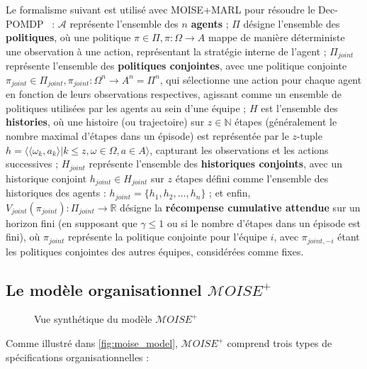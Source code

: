 Le formalisme suivant est utilisé avec MOISE+MARL pour résoudre le Dec-POMDP~\cite{Beynier2013,Albrecht2024} : $\mathcal{A}$ représente l'ensemble des $n$ \textbf{agents} ; $\Pi$ désigne l'ensemble des \textbf{politiques}, où une politique $\pi \in \Pi, \pi: \Omega \rightarrow A$ mappe de manière déterministe une observation à une action, représentant la stratégie interne de l'agent ; $\Pi_{joint}$ représente l'ensemble des \textbf{politiques conjointes}, avec une politique conjointe $\pi_{joint} \in \Pi_{joint}, \pi_{joint}: \Omega^n \rightarrow A^n = \Pi^n$, qui sélectionne une action pour chaque agent en fonction de leurs observations respectives, agissant comme un ensemble de politiques utilisées par les agents au sein d'une équipe ; $H$ est l'ensemble des \textbf{histories}, où une histoire (ou trajectoire) sur $z \in \mathbb{N}$ étapes (généralement le nombre maximal d'étapes dans un épisode) est représentée par le $z$-tuple $h = \langle \langle \omega_{k}, a_{k}\rangle | k \leq z, \omega \in \Omega, a \in A\rangle$, capturant les observations et les actions successives ; $H_{joint}$ représente l'ensemble des \textbf{historiques conjoints}, avec un historique conjoint $h_{joint} \in H_{joint}$ sur $z$ étapes défini comme l'ensemble des historiques des agents : $h_{joint} = \{h_1, h_2, \dots, h_n\}$ ; et enfin, $V_{joint}(\pi_{joint}): \Pi_{joint} \rightarrow \mathbb{R}$ désigne la \textbf{récompense cumulative attendue} sur un horizon fini (en supposant que $\gamma \leq 1$ ou si le nombre d'étapes dans un épisode est fini), où $\pi_{joint}$ représente la politique conjointe pour l'équipe $i$, avec $\pi_{joint,-i}$ étant les politiques conjointes des autres équipes, considérées comme fixes.



\subsection{Le modèle organisationnel $\mathcal{M}OISE^+$}

\begin{figure}[h!]
    
    \caption{Vue synthétique du modèle $\mathcal{M}OISE^+$}
    \label{fig:moise_model}
\end{figure}

Comme illustré dans \autoref{fig:moise_model}, $\mathcal{M}OISE^+$ comprend trois types de spécifications organisationnelles :

